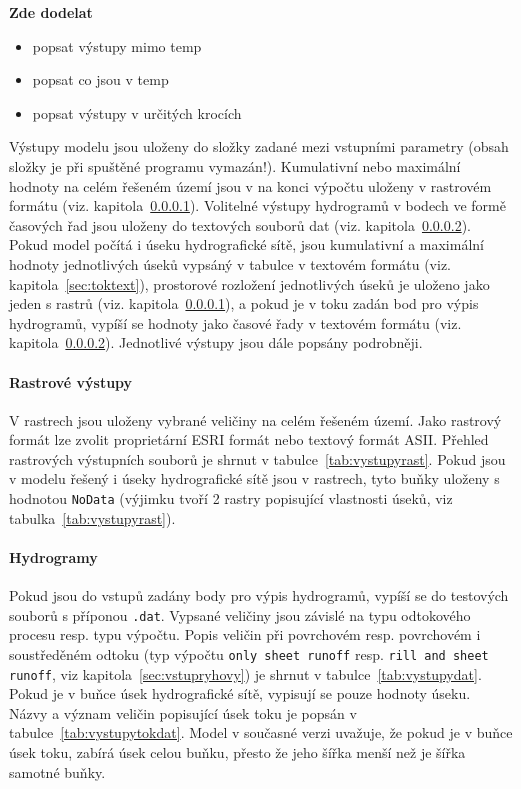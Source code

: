 \textbf{Zde dodelat}
\begin{itemize}
  \item popsat výstupy mimo temp
  \item popsat co jsou v temp
  \item popsat výstupy v určitých krocích
\end{itemize}

Výstupy modelu jsou uloženy do složky zadané mezi vstupními parametry (obsah složky je při spuštěné programu vymazán!). Kumulativní nebo maximální hodnoty na celém řešeném území jsou v na konci výpočtu uloženy v rastrovém formátu (viz. kapitola~\ref{sec:rastr}). Volitelné výstupy hydrogramů v bodech ve formě časových řad jsou uloženy do textových souborů dat (viz. kapitola~\ref{sec:hydrogramy}). Pokud model počítá i úseku hydrografické sítě, jsou kumulativní a maximální hodnoty jednotlivých úseků vypsáný v tabulce v textovém formátu (viz. kapitola~\ref{sec:toktext}), prostorové rozložení jednotlivých úseků je uloženo jako jeden s rastrů (viz. kapitola~\ref{sec:rastr}), a pokud je v toku zadán bod pro výpis hydrogramů, vypíší se hodnoty jako časové řady v textovém formátu (viz. kapitola~\ref{sec:hydrogramy}). Jednotlivé výstupy jsou dále popsány podrobněji. 



\paragraph{Rastrové výstupy}\label{sec:rastr}

V rastrech jsou uloženy vybrané veličiny na celém řešeném území. Jako rastrový formát lze zvolit proprietární ESRI formát nebo textový formát ASII. Přehled rastrových výstupních souborů je shrnut v tabulce~\ref{tab:vystupyrast}. Pokud jsou v modelu řešený i úseky hydrografické sítě jsou v rastrech, tyto buňky uloženy s hodnotou {\tt NoData} (výjimku tvoří 2 rastry popisující vlastnosti úseků, viz tabulka~\ref{tab:vystupyrast}).  





\paragraph{Hydrogramy}\label{sec:hydrogramy}

Pokud jsou do vstupů zadány body pro výpis hydrogramů, vypíší se do testových souborů s příponou {\tt.dat}. Vypsané veličiny jsou závislé na typu odtokového procesu resp. typu výpočtu. Popis veličin při povrchovém resp. povrchovém i soustředěném odtoku (typ výpočtu {\tt only sheet runoff} resp. {\tt rill and sheet runoff}, viz kapitola~\ref{sec:vstupryhovy}) je shrnut v tabulce~\ref{tab:vystupydat}. Pokud je v buňce úsek hydrografické sítě, vypisují se pouze hodnoty úseku. Názvy a význam veličin popisující úsek toku je popsán v tabulce~\ref{tab:vystupytokdat}. Model v současné verzi uvažuje, že pokud je v buňce úsek toku, zabírá úsek celou buňku, přesto že jeho šířka menší než je šířka samotné buňky.  



